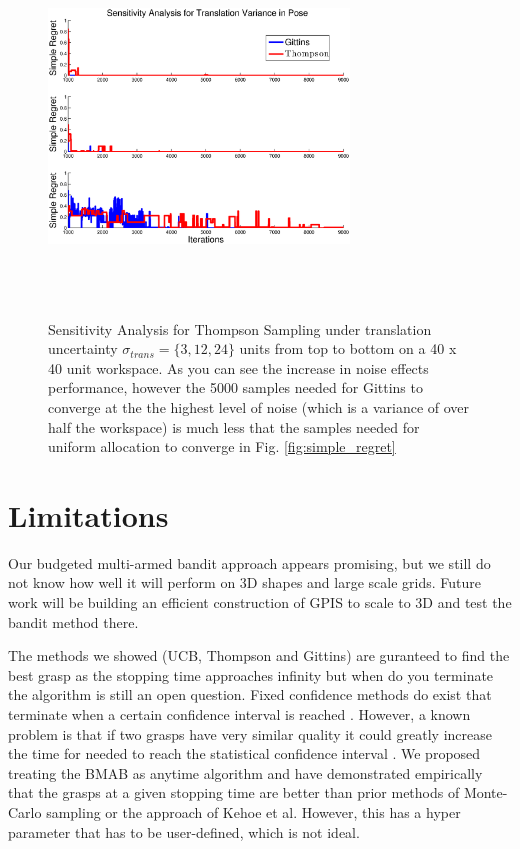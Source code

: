 \documentclass[journal,transmag]{IEEEtran}%
\begin{document}
\begin{figure}[ht!]
\centering
\includegraphics[width = 8cm, height = 10cm]{matlab_figures/sensitivity_trans.eps}
\caption{ \footnotesize Sensitivity Analysis for Thompson Sampling under translation uncertainty $\sigma_{trans} = \lbrace 3, 12, 24 \rbrace$ units from top to bottom on a 40 x 40 unit workspace.  As you can see the increase in noise effects performance, however the 5000 samples needed for Gittins to  converge at the the highest level of noise (which is a variance of over half the workspace) is much less that the samples needed for uniform allocation to converge in Fig. \ref{fig:simple_regret}}
\vspace*{-10pt}
\label{fig:trans_sens}
\end{figure}






\section{Limitations} 

Our budgeted multi-armed bandit approach appears promising, but we still do not know how well it will perform on 3D shapes and large scale grids. Future work will be building an efficient construction of GPIS to scale to 3D and test the bandit method there. 

The methods we showed (UCB, Thompson and Gittins) are guranteed to find the best grasp as the stopping time approaches infinity \cite{kaufmann2012bayesian,grawal2011analysis,weber1992gittins} but when do you terminate the algorithm is still an open question. Fixed confidence methods do exist that terminate when a certain confidence interval is reached \cite{maron1993hoeffding} \cite{mnih2008empirical}. However, a known problem is that if two grasps have very similar quality it could greatly increase the time for needed to reach the statistical confidence interval \cite{audibert2010best}. We proposed treating the BMAB as anytime algorithm and have demonstrated empirically that the grasps at a given stopping time are better than prior methods of Monte-Carlo sampling or the approach of Kehoe et al. However, this has a hyper parameter that has to be user-defined, which is not ideal.  
\end{document}
